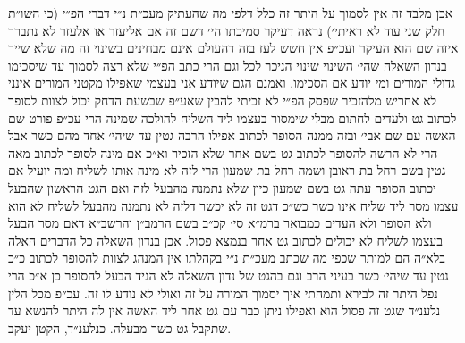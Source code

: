 \documentclass[12pt, openany]{book}
\begin{document}
\begin{multicols}{2}
אכן מלבד זה אין לסמוך על היתר זה כלל דלפי מה שהעתיק מעכ״ת נ״י דברי הפ״י (כי השו״ת חלק שני עוד לא ראיתי׳) נראה דעיקר סמיכתו הי׳ דשם זה אם אליעזר או אלעזר לא נתברר איזה שם הוא העיקר ועכ״פ אין חשש לעז בזה דהעולם אינם מבחינים בשינוי זה מה שלא שייך בנדון השאלה שהי׳ השינוי שינוי הניכר לכל וגם הרי כתב הפ״י שלא רצה לסמוך עד שיסכימו גדולי המורים ומי יודע אם הסכימו. ואמנם הגם שיודע אני בעצמי שאפילו מקטני המורים אינני לא אחריש מלהזכיר שפסק הפ״י לא זכיתי להבין שאע״פ שבשעת הדחק יכול לצוות לסופר לכתוב גט ולעדים לחתום מבלי שימסור בעצמו ליד השליח להולכה שמינה הרי עכ״פ פורט שם האשה עם שם אבי׳ ובזה ממנה הסופר לכתוב אפילו הרבה גטין עד שיהי׳ אחד מהם כשר אבל הרי לא הרשה להסופר לכתוב גט בשם אחר שלא הזכיר וא״כ אם מינה לסופר לכתוב מאה גטין בשם רחל בת ראובן ושמה רחל בת שמעון הרי לזה לא מינה אותו לשליח ומה יועיל אם יכתוב הסופר עתה גט בשם שמעון כיון שלא נתמנה מהבעל לזה ואם הגט הראשון שהבעל עצמו מסר ליד שליח אינו כשר כש״כ דגט זה לא יכשר דלזה לא נתמנה מהבעל לשליח לא הוא ולא הסופר ולא העדים כמבואר ברמ״א סי׳ קכ״ב בשם הרמב״ן והרשב״א דאם מסר הבעל בעצמו לשליח לא יכולים לכתוב גט אחר בנמצא פסול. אכן בנדון השאלה כל הדברים האלה בלא״ה הם למותר שכפי מה שכתב מעכ״ת נ״י בקהלתו אין המנהג לצוות להסופר לכתוב כ״כ גטין עד שיהי׳ כשר בעיני הרב וגם בהגט של נדון השאלה לא הגיד הבעל להסופר כן א״כ הרי נפל היתר זה לבירא ותמהתי איך יסמוך המורה על זה ואולי לא נודע לו זה. עכ״פ מכל הלין נלענ״ד שגט זה פסול הוא ואפילו ניתן כבר עם גט אחר ליד האשה אין לה היתר להנשא עד שתקבל גט כשר מבעלה. כנלענ״ד, הקטן יעקב.\\\vspace{0pt}

\end{multicols}\newpage
\end{document}
